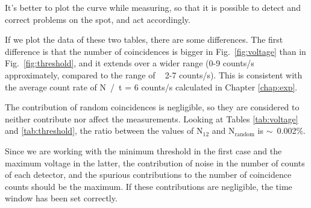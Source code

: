 It's better to plot the curve while measuring, so that it is possible to detect and correct problems on the spot, and act accordingly.

If we plot the data of these two tables, there are some differences. The first difference is that the number of coincidences is bigger in Fig.~\ref{fig:voltage} than in Fig.~\ref{fig:threshold}, and it extends over a wider range (0-9 counts/s approximately, compared to the range of ~ 2-7 counts/s). This is consistent with the average count rate of N~/~t = 6 counts/s calculated in Chapter \ref{chap:exp}.

The contribution of random coincidences is negligible, so they are considered to neither contribute nor affect the measurements. Looking at Tables \ref{tab:voltage} and \ref{tab:threshold}, the ratio between the values of N$_{12}$  and N$_\text{random}$  is $\sim$~0.002\%.

Since we are working with the minimum threshold in the first case and the maximum voltage in the latter, the contribution of noise in the number of counts of each detector, and the spurious contributions to the number of coincidence counts should be the maximum. If these contributions are negligible, the time window has been set correctly.\vspace*{-1.5ex}

